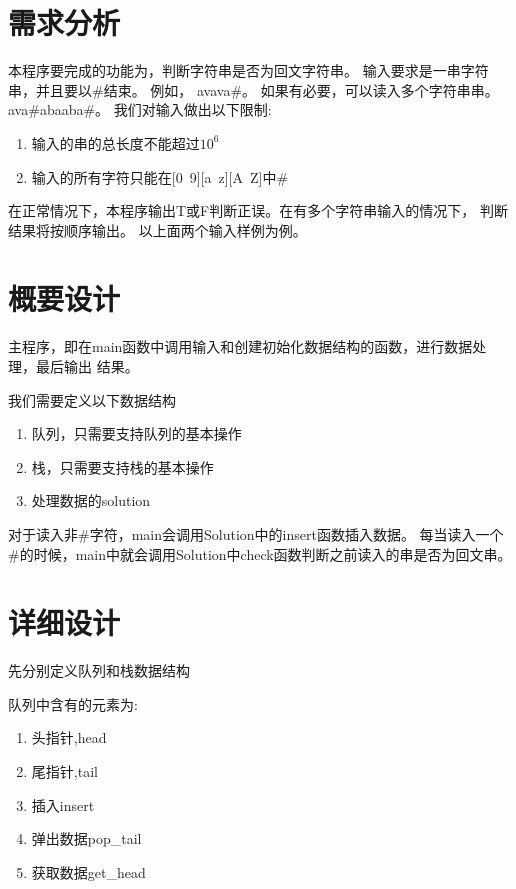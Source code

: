 \section{需求分析}

本程序要完成的功能为，判断字符串是否为回文字符串。
输入要求是一串字符串，并且要以\#结束。
例如，
avava\#。
如果有必要，可以读入多个字符串串。
ava\#abaaba\#。
我们对输入做出以下限制:
\begin{enumerate}
   \item 输入的串的总长度不能超过$10^6$
   \item 输入的所有字符只能在[0~9][a~z][A~Z]中\#
\end{enumerate}


在正常情况下，本程序输出T或F判断正误。在有多个字符串输入的情况下，
判断结果将按顺序输出。
以上面两个输入样例为例。



\section{概要设计}
   主程序，即在main函数中调用输入和创建初始化数据结构的函数，进行数据处理，最后输出
   结果。


   我们需要定义以下数据结构
   \begin{enumerate}
      \item 队列，只需要支持队列的基本操作
      \item 栈，只需要支持栈的基本操作
      \item 处理数据的solution
   \end{enumerate}


   对于读入非\#字符，main会调用Solution中的insert函数插入数据。
   每当读入一个\#的时候，main中就会调用Solution中check函数判断之前读入的串是否为回文串。

\section{详细设计}

   先分别定义队列和栈数据结构


   队列中含有的元素为:
   \begin{enumerate}
      \item 头指针,head
      \item 尾指针,tail
      \item 插入insert
      \item 弹出数据pop\_tail
      \item 获取数据get\_head
   \end{enumerate}



